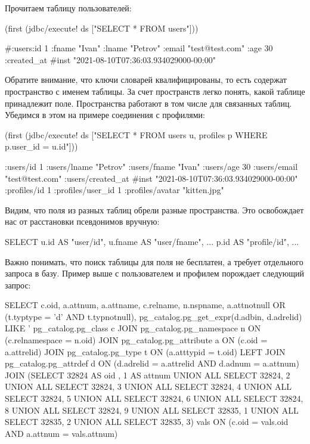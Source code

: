 Прочитаем таблицу пользователей:

\begin{english}
  \begin{clojure}
(first (jdbc/execute! ds ["SELECT * FROM users"]))

#:users{:id 1
        :fname "Ivan"
        :lname "Petrov"
        :email "test@test.com"
        :age 30
        :created_at #inst "2021-08-10T07:36:03.934029000-00:00"}
  \end{clojure}
\end{english}

Обратите внимание, что ключи словарей квалифицированы, то есть содержат пространство с именем таблицы. За счет пространств легко понять, какой таблице принадлежит поле. Пространства работают в том числе для связанных таблиц. Убедимся в этом на примере соединения с профилями:

\begin{english}
  \begin{clojure}
(first (jdbc/execute! ds ["SELECT * FROM users u, profiles p WHERE p.user_id = u.id"]))

{:users/id 1
 :users/lname "Petrov"
 :users/fname "Ivan"
 :users/age 30
 :users/email "test@test.com"
 :users/created_at #inst "2021-08-10T07:36:03.934029000-00:00"
 :profiles/id 1
 :profiles/user_id 1
 :profiles/avatar "kitten.jpg"}
  \end{clojure}
\end{english}

Видим, что поля из разных таблиц обрели разные пространства. Это освобождает нас от расстановки псевдонимов вручную:

\begin{english}
  \begin{sql}
SELECT
  u.id     AS "user/id",
  u.fname  AS "user/fname",
  ...
  p.id     AS "profile/id",
  ...
  \end{sql}
\end{english}

Важно понимать, что поиск таблицы для поля не бесплатен, а требует отдельного запроса в базу. Пример выше с пользователем и профилем порождает следующий запрос:

\begin{english}
  \begin{sql}
SELECT c.oid, a.attnum, a.attname, c.relname, n.nspname,
a.attnotnull OR (t.typtype = 'd' AND t.typnotnull),
pg_catalog.pg_get_expr(d.adbin, d.adrelid) LIKE '%
pg_catalog.pg_class c JOIN pg_catalog.pg_namespace n
ON (c.relnamespace = n.oid) JOIN pg_catalog.pg_attribute a
ON (c.oid = a.attrelid) JOIN pg_catalog.pg_type t ON (a.atttypid
= t.oid) LEFT JOIN pg_catalog.pg_attrdef d ON (d.adrelid =
a.attrelid AND d.adnum = a.attnum) JOIN (SELECT 32824 AS oid , 1
AS attnum UNION ALL SELECT 32824, 2 UNION ALL SELECT 32824, 3
UNION ALL SELECT 32824, 4 UNION ALL SELECT 32824, 5 UNION ALL
SELECT 32824, 6 UNION ALL SELECT 32824, 8 UNION ALL SELECT 32824,
9 UNION ALL SELECT 32835, 1 UNION ALL SELECT 32835, 2 UNION ALL
SELECT 32835, 3) vals ON (c.oid = vals.oid AND a.attnum =
vals.attnum)
  \end{sql}
\end{english}

